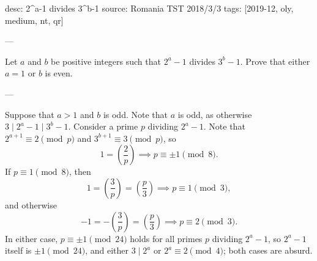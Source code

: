 desc: 2^a-1 divides 3^b-1
source: Romania TST 2018/3/3
tags: [2019-12, oly, medium, nt, qr]

---

Let $a$ and $b$ be positive integers such that $2^a-1$ divides $3^b-1$. Prove that either $a=1$ or $b$ is even.

---

Suppose that $a>1$ and $b$ is odd. Note that $a$ is odd, as otherwise $3\mid2^a-1\mid3^b-1$. Consider a prime $p$ dividing $2^a-1$. Note that $2^{a+1}\equiv2\pmod p$ and $3^{b+1}\equiv3\pmod p$, so \[1=\left(\frac2p\right)\implies p\equiv\pm1\pmod8.\]
If $p\equiv1\pmod8$, then \[1=\left(\frac3p\right)=\left(\frac p3\right)\implies p\equiv1\pmod3,\]
and otherwise \[-1=-\left(\frac3p\right)=\left(\frac p3\right)\implies p\equiv2\pmod3.\]
In either case, $p\equiv\pm1\pmod{24}$ holds for all primes $p$ dividing $2^a-1$, so $2^a-1$ itself is $\pm1\pmod{24}$, and either $3\mid2^a$ or $2^a\equiv2\pmod4$; both cases are absurd.


